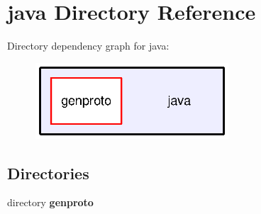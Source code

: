 \section{java Directory Reference}
\label{dir_93c6ba7fb77bae0709fae89c9c13b44a}
Directory dependency graph for java\+:\nopagebreak
\begin{figure}[H]
\begin{center}
\leavevmode
\includegraphics[width=204pt]{dir_93c6ba7fb77bae0709fae89c9c13b44a_dep}
\end{center}
\end{figure}
\subsection*{Directories}
\begin{DoxyCompactItemize}
\item 
directory {\bf genproto}
\end{DoxyCompactItemize}
